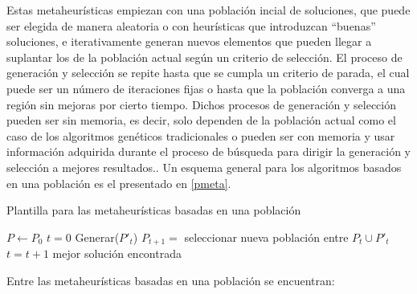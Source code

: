 Estas metaheurísticas empiezan con una población incial de soluciones, que puede ser elegida de manera aleatoria o con heurísticas que introduzcan ``buenas'' soluciones, e iterativamente generan nuevos elementos que pueden llegar a suplantar los de la población actual según un criterio de selección. El proceso de generación y selección se repite hasta que se cumpla un criterio de parada, el cual puede ser un número de iteraciones fijas o hasta que la población converga a una región sin mejoras por cierto tiempo. Dichos procesos de generación y selección pueden ser sin memoria, es decir, solo dependen de la población actual como el caso de los algoritmos genéticos tradicionales o pueden ser con memoria y usar información adquirida durante el proceso de búsqueda para dirigir la generación y selección a mejores resultados.\cite{talbi2009metaheuristics}. Un esquema general para los algoritmos basados en una población es el presentado en \ref{pmeta}.

\begin{algorithm}
\caption{Plantilla para las metaheurísticas basadas en una población}
\label{pmeta}
\begin{algorithmic}[1]

\State $P \gets P_0$ 
\State $t=0$
\Repeat
	\State Generar($P'_t$) 
	\State $P_{t+1}=$ seleccionar nueva población entre $P_t \cup P'_t$
	\State $t=t+1$
\State \Return mejor solución encontrada

\end{algorithmic}
\end{algorithm}

Entre las metaheurísticas basadas en una población se encuentran:

